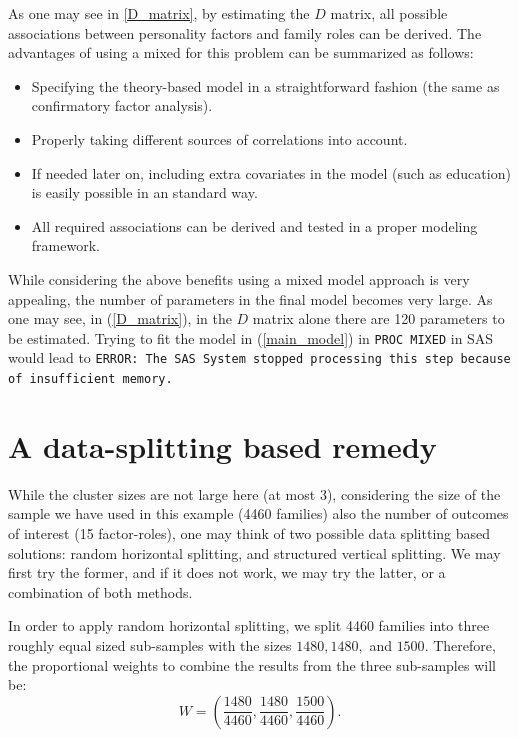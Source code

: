 \documentclass[11pt,a5paper,twoside]{book}
\begin{document}
As one may see in \ref{D_matrix}, by estimating the $D$ matrix, all possible associations between personality factors and family roles can be derived. The advantages of using a mixed for this problem can be summarized as follows:
\begin{itemize}
\item Specifying the theory-based model in a straightforward fashion (the same as confirmatory factor analysis).
\item Properly taking different sources of correlations into account.
\item If needed later on, including extra covariates in the model (such as education) is easily possible in an standard way.
\item All required associations can be derived and tested in a proper modeling framework.
\end{itemize}

While considering the above benefits using a mixed model approach is very appealing, the number of parameters in the final model becomes very large. As one may see, in (\ref{D_matrix}), in the $D$ matrix alone there are 120 parameters to be estimated. Trying to fit the model in (\ref{main_model}) in {\tt{PROC MIXED}} in SAS would lead to {\tt{ERROR: The SAS System stopped processing this step because of insufficient memory.\\}} 


\section{A data-splitting based remedy}

While the cluster sizes are not large here (at most 3), considering the size of the sample we have used in this example (4460 families) also the number of outcomes of interest (15 factor-roles), one may think of two possible data splitting based solutions: random horizontal splitting, and structured vertical splitting. We may first try the former, and if it does not work, we may try the latter, or a combination of both methods. 


In order to apply random horizontal splitting, we split 4460 families into three roughly equal sized sub-samples with 
the sizes $1480,1480,$ and $1500$. Therefore, the proportional weights to combine the results from the three sub-samples will be:
\begin{equation}
\label{prop_weights}
W=(\frac{1480}{4460},\frac{1480}{4460},\frac{1500}{4460}).
\end{equation}
\end{document}
